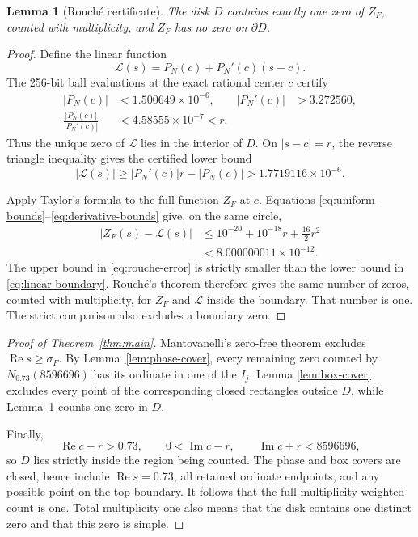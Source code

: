 \documentclass[11pt]{article}
\newtheorem{lemma}[theorem]{Lemma}
\theoremstyle{remark}
\newcommand{\ZF}{Z_F}
\newcommand{\real}{\operatorname{Re}}
\newcommand{\imag}{\operatorname{Im}}
\begin{document}
\begin{lemma}[Rouch\'e certificate]\label{lem:rouche}
The disk $D$ contains exactly one zero of $\ZF$, counted with multiplicity,
and $\ZF$ has no zero on $\partial D$.
\end{lemma}

\begin{proof}
Define the linear function
\[
 \mathcal L(s)=P_N(c)+P_N'(c)(s-c).
\]
The 256-bit ball evaluations at the exact rational center $c$ certify
\begin{align}
 |P_N(c)|&<1.500649\times10^{-6},&
 |P_N'(c)|&>3.272560,\label{eq:center-bounds}\\
 \frac{|P_N(c)|}{|P_N'(c)|}
   &<4.58555\times10^{-7}<r.&\label{eq:linear-zero}
\end{align}
Thus the unique zero of $\mathcal L$ lies in the interior of $D$.  On
$|s-c|=r$, the reverse triangle inequality gives the certified lower bound
\begin{equation}\label{eq:linear-boundary}
 |\mathcal L(s)|
 \geq |P_N'(c)|r-|P_N(c)|
 >1.7719116\times10^{-6}.
\end{equation}

Apply Taylor's formula to the full function $\ZF$ at $c$.  Equations
\eqref{eq:uniform-bounds}--\eqref{eq:derivative-bounds} give, on the same
circle,
\begin{align}
 |\ZF(s)-\mathcal L(s)|
 &\leq10^{-20}+10^{-18}r+\frac{16}{2}r^2\\
 &<8.000000011\times10^{-12}.
                                                        \label{eq:rouche-error}
\end{align}
The upper bound in \eqref{eq:rouche-error} is strictly smaller than the lower
bound in \eqref{eq:linear-boundary}.  Rouch\'e's theorem therefore gives the
same number of zeros, counted with multiplicity, for $\ZF$ and $\mathcal L$
inside the boundary.  That number is one.  The strict comparison also
excludes a boundary zero.
\end{proof}

\begin{proof}[Proof of Theorem~\ref{thm:main}]
Mantovanelli's zero-free theorem excludes $\real s\geq\sigma_F$.  By
Lemma~\ref{lem:phase-cover}, every remaining zero counted by
$N_{0.73}(8596696)$ has its ordinate in one of the $I_j$.  Lemma
\ref{lem:box-cover} excludes every point of the corresponding closed
rectangles outside $D$, while Lemma~\ref{lem:rouche} counts one zero in $D$.

Finally,
\[
 \real c-r>0.73,\qquad 0<\imag c-r,\qquad
 \imag c+r<8596696,
\]
so $D$ lies strictly inside the region being counted.  The phase and box
covers are closed, hence include $\real s=0.73$, all retained ordinate
endpoints, and any possible point on the top boundary.  It follows that the
full multiplicity-weighted count is one.  Total multiplicity one also means
that the disk contains one distinct zero and that this zero is simple.
\end{proof}
\end{document}
